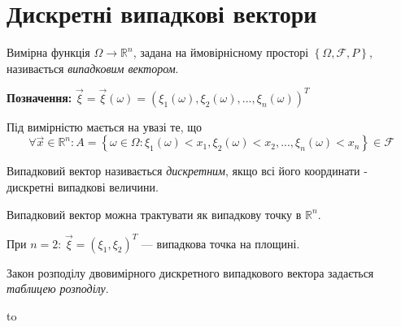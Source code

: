 \section{Дискретні випадкові вектори}
\begin{definition}
    Вимірна функція $\Omega \rightarrow \mathbb{R}^n$, задана на ймовірнісному 
    просторі $\left\{\Omega, \mathcal{F}, P \right\}$, 
    називається \emph{випадковим вектором}.
\end{definition}

\noindent \textbf{Позначення: }
$\vec{\xi} = \vec{\xi}(\omega) = 
\left(\xi_1(\omega), \xi_2(\omega), ... , \xi_n(\omega)\right)^{T}$

\begin{remark}
    Під вимірністю мається на увазі те, що 
    \begin{equation*}
        \forall \vec{x} \in \mathbb{R}^n: 
        A=\left\{\omega \in \Omega: \xi_1(\omega) < x_1, 
                                    \xi_2(\omega) < x_2,
                                    ... ,
                                    \xi_n(\omega) < x_n\right\}
        \in \mathcal{F}
    \end{equation*}
\end{remark}

\begin{definition}
    Випадковий вектор називається \emph{дискретним}, якщо всі його координати - 
    дискретні випадкові величини.
\end{definition}
\begin{remark}
    Випадковий вектор можна трактувати як випадкову точку в $\mathbb{R}^n$.

    При $n = 2$: $\vec{\xi} = (\xi_1, \xi_2)^T$ --- випадкова точка на площині. 
\end{remark}

Закон розподілу двовимірного дискретного випадкового вектора задається 
\emph{таблицею розподілу}.


\hbox to 